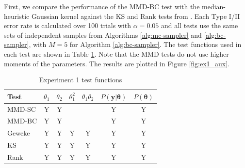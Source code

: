 \documentclass[a4paper,11pt]{article}
\begin{document}
First, we compare the performance of the MMD-BC test with the median-heuristic Gaussian kernel against the KS and Rank tests from \cite{gandy_unit_2020}. Each Type I/II error rate is calculated over 100 trials with $\alpha=0.05$ and all tests use the same sets of independent samples from Algorithms \ref{alg:mc-sampler} and \ref{alg:bc-sampler}, with $M=5$ for Algorithm \ref{alg:bc-sampler}. The test functions used in each test are shown in Table \ref{tab:ex1_testfn}. Note that the MMD tests do not use higher moments of the parameters. The results are plotted in Figure \ref{fig:ex1_aux}.

\begin{table}[H]
    \centering
    \begin{tabular}{l|c|c|c|c|c|c}
         Test  & $\theta_{1}$ & $\theta_{2}$ & $\theta_{1}^{2}$ & $\theta_{1}\theta_{2}$ & $P(\mathbf{y}|\mathbf{\theta})$ & $P(\mathbf{\theta})$ \\
         \hline
         MMD-SC & Y & Y & & & Y & Y \\
         MMD-BC & Y & Y & & & Y & Y \\
         Geweke & Y & Y & Y & Y & Y & Y \\
         KS & Y & Y & Y & Y & Y & Y \\
         Rank & Y & Y & Y & Y & Y & Y \\
    \end{tabular}
    \caption{Experiment 1 test functions}
    \label{tab:ex1_testfn}
\end{table}
\end{document}
